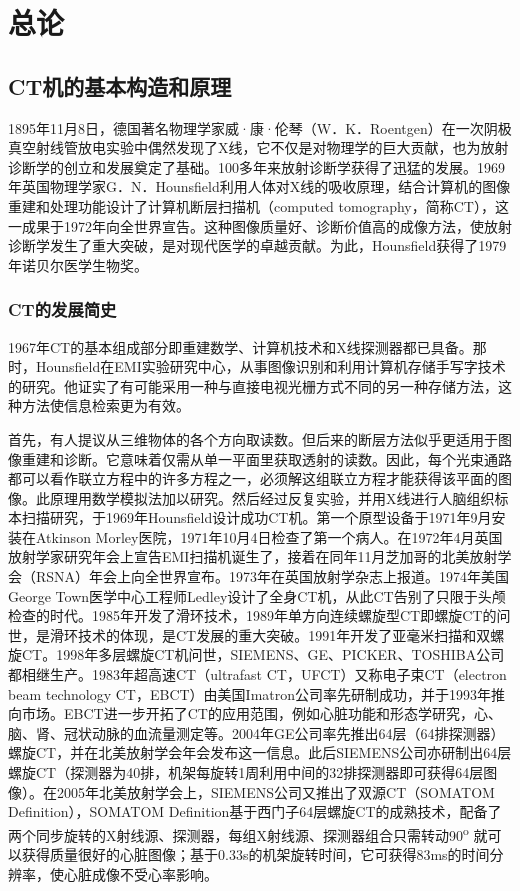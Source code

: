 \chapter{总论}

\section{CT机的基本构造和原理}

1895年11月8日，德国著名物理学家威·康·伦琴（W．K．Roentgen）在一次阴极真空射线管放电实验中偶然发现了X线，它不仅是对物理学的巨大贡献，也为放射诊断学的创立和发展奠定了基础。100多年来放射诊断学获得了迅猛的发展。1969年英国物理学家G．N．Hounsfield利用人体对X线的吸收原理，结合计算机的图像重建和处理功能设计了计算机断层扫描机（computed
tomography，简称CT），这一成果于1972年向全世界宣告。这种图像质量好、诊断价值高的成像方法，使放射诊断学发生了重大突破，是对现代医学的卓越贡献。为此，Hounsfield获得了1979年诺贝尔医学生物奖。

\subsection{CT的发展简史}

1967年CT的基本组成部分即重建数学、计算机技术和X线探测器都已具备。那时，Hounsfield在EMI实验研究中心，从事图像识别和利用计算机存储手写字技术的研究。他证实了有可能采用一种与直接电视光栅方式不同的另一种存储方法，这种方法使信息检索更为有效。

首先，有人提议从三维物体的各个方向取读数。但后来的断层方法似乎更适用于图像重建和诊断。它意味着仅需从单一平面里获取透射的读数。因此，每个光束通路都可以看作联立方程中的许多方程之一，必须解这组联立方程才能获得该平面的图像。此原理用数学模拟法加以研究。然后经过反复实验，并用X线进行人脑组织标本扫描研究，于1969年Hounsfield设计成功CT机。第一个原型设备于1971年9月安装在Atkinson
Morley医院，1971年10月4日检查了第一个病人。在1972年4月英国放射学家研究年会上宣告EMI扫描机诞生了，接着在同年11月芝加哥的北美放射学会（RSNA）年会上向全世界宣布。1973年在英国放射学杂志上报道。1974年美国George
Town医学中心工程师Ledley设计了全身CT机，从此CT告别了只限于头颅检查的时代。1985年开发了滑环技术，1989年单方向连续螺旋型CT即螺旋CT的问世，是滑环技术的体现，是CT发展的重大突破。1991年开发了亚毫米扫描和双螺旋CT。1998年多层螺旋CT机问世，SIEMENS、GE、PICKER、TOSHIBA公司都相继生产。1983年超高速CT（ultrafast
CT，UFCT）又称电子束CT（electron beam technology
CT，EBCT）由美国Imatron公司率先研制成功，并于1993年推向市场。EBCT进一步开拓了CT的应用范围，例如心脏功能和形态学研究，心、脑、肾、冠状动脉的血流量测定等。2004年GE公司率先推出64层（64排探测器）螺旋CT，并在北美放射学会年会发布这一信息。此后SIEMENS公司亦研制出64层螺旋CT（探测器为40排，机架每旋转1周利用中间的32排探测器即可获得64层图像）。在2005年北美放射学会上，SIEMENS公司又推出了双源CT（SOMATOM
Definition），SOMATOM
Definition基于西门子64层螺旋CT的成熟技术，配备了两个同步旋转的X射线源、探测器，每组X射线源、探测器组合只需转动90\textsuperscript{o}
就可以获得质量很好的心脏图像；基于0.33s的机架旋转时间，它可获得83ms的时间分辨率，使心脏成像不受心率影响。

